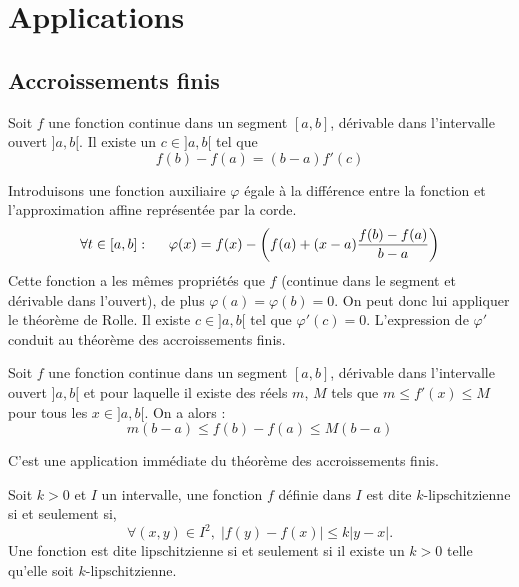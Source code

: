 \section{Applications}
\subsection{Accroissements finis}
\begin{thm}
 Soit $f$ une fonction continue dans un segment $[a,b]$, dérivable dans l'intervalle ouvert $]a,b[$. Il existe un $c\in ]a,b[$ tel que
\begin{displaymath}
 f(b)-f(a) = (b-a)f'(c)
\end{displaymath}
\end{thm}
\begin{demo}
 Introduisons une fonction auxiliaire $\varphi$ égale à la différence entre la fonction et l'approximation affine représentée par la corde.
\begin{displaymath}
 \forall t\in[a,b]:\hspace{0.5cm}
\varphi(x) = f(x)-\left( f(a)+(x-a)\frac{f(b)-f(a)}{b-a}\right) 
\end{displaymath}
 Cette fonction a les mêmes propriétés que $f$ (continue dans le segment et dérivable dans l'ouvert), de plus $\varphi(a)=\varphi(b)=0$. On peut donc lui appliquer le théorème de Rolle. Il existe $c\in ]a,b[$ tel que $\varphi'(c)=0$. L'expression de $\varphi'$ conduit au théorème des accroissements finis.
\end{demo}
\begin{thm}
 Soit $f$ une fonction continue dans un segment $[a,b]$, dérivable dans l'intervalle ouvert $]a,b[$ et pour laquelle il existe des réels $m$, $M$ tels que $m\leq f'(x)\leq M$ pour tous les $x\in ]a,b[$. On a alors :
\begin{displaymath}
 m(b-a)\leq f(b)-f(a)\leq M(b-a)
\end{displaymath}
\end{thm}
\begin{demo}
 C'est une application immédiate du théorème des accroissements finis.
\end{demo}
\begin{defi}
 Soit $k>0$ et $I$ un intervalle, une fonction $f$ définie dans $I$ est dite $k$-lipschitzienne si et seulement si,
\[
 \forall (x,y)\in I^2, \; \left|f(y) -f(x)\right| \leq k\left|y-x\right|.
\]
Une fonction est dite lipschitzienne si et seulement si il existe un $k>0$ telle qu'elle soit $k$-lipschitzienne.
\end{defi}
